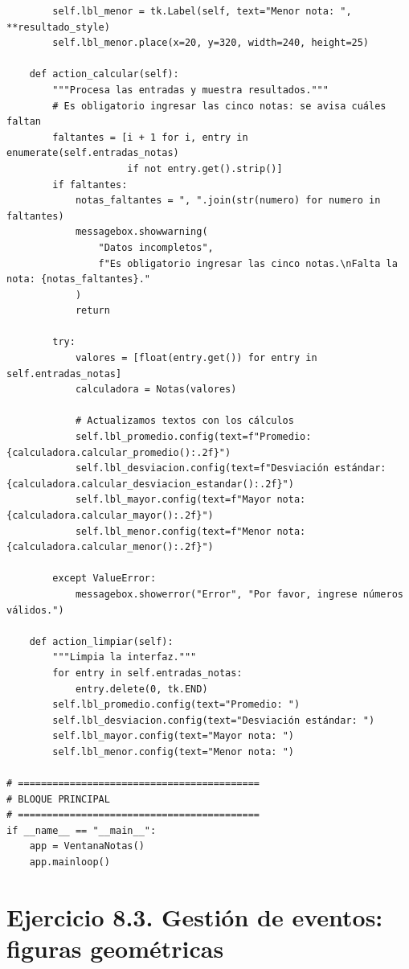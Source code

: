 \documentclass[11pt, a4paper]{article}
\begin{document}
\begin{lstlisting}
        self.lbl_menor = tk.Label(self, text="Menor nota: ", **resultado_style)
        self.lbl_menor.place(x=20, y=320, width=240, height=25)

    def action_calcular(self):
        """Procesa las entradas y muestra resultados."""
        # Es obligatorio ingresar las cinco notas: se avisa cuáles faltan
        faltantes = [i + 1 for i, entry in enumerate(self.entradas_notas)
                     if not entry.get().strip()]
        if faltantes:
            notas_faltantes = ", ".join(str(numero) for numero in faltantes)
            messagebox.showwarning(
                "Datos incompletos",
                f"Es obligatorio ingresar las cinco notas.\nFalta la nota: {notas_faltantes}."
            )
            return

        try:
            valores = [float(entry.get()) for entry in self.entradas_notas]
            calculadora = Notas(valores)
            
            # Actualizamos textos con los cálculos
            self.lbl_promedio.config(text=f"Promedio: {calculadora.calcular_promedio():.2f}")
            self.lbl_desviacion.config(text=f"Desviación estándar: {calculadora.calcular_desviacion_estandar():.2f}")
            self.lbl_mayor.config(text=f"Mayor nota: {calculadora.calcular_mayor():.2f}")
            self.lbl_menor.config(text=f"Menor nota: {calculadora.calcular_menor():.2f}")
            
        except ValueError:
            messagebox.showerror("Error", "Por favor, ingrese números válidos.")

    def action_limpiar(self):
        """Limpia la interfaz."""
        for entry in self.entradas_notas:
            entry.delete(0, tk.END)
        self.lbl_promedio.config(text="Promedio: ")
        self.lbl_desviacion.config(text="Desviación estándar: ")
        self.lbl_mayor.config(text="Mayor nota: ")
        self.lbl_menor.config(text="Menor nota: ")

# ==========================================
# BLOQUE PRINCIPAL
# ==========================================
if __name__ == "__main__":
    app = VentanaNotas()
    app.mainloop()
\end{lstlisting}

\newpage
\section{Ejercicio 8.3. Gestión de eventos: figuras geométricas}
\end{document}
